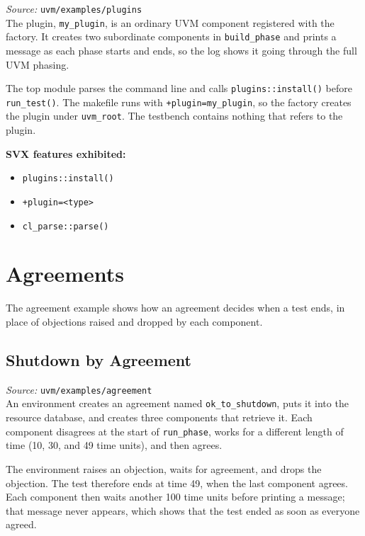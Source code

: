\documentclass[11pt,letterpaper]{report}
\begin{document}
\textit{Source:} \texttt{uvm/examples/plugins}\\

The plugin, \texttt{my\_plugin}, is an ordinary UVM component registered with the factory. It creates two subordinate components in \texttt{build\_phase} and prints a message as each phase starts and ends, so the log shows it going through the full UVM phasing.

The top module parses the command line and calls \texttt{plugins::install()} before \texttt{run\_test()}. The makefile runs with \texttt{+plugin=my\_plugin}, so the factory creates the plugin under \texttt{uvm\_root}. The testbench contains nothing that refers to the plugin.

\textbf{SVX features exhibited:}

\begin{itemize}
  \item \texttt{plugins::install()}
  \item \texttt{+plugin=\textless{}type\textgreater{}}
  \item \texttt{cl\_parse::parse()}
\end{itemize}
\chapter{Agreements}

The agreement example shows how an agreement decides when a test ends, in place of objections raised and dropped by each component.

\section{Shutdown by Agreement}

\textit{Source:} \texttt{uvm/examples/agreement}\\

An environment creates an agreement named \texttt{ok\_to\_shutdown}, puts it into the resource database, and creates three components that retrieve it. Each component disagrees at the start of \texttt{run\_phase}, works for a different length of time (10, 30, and 49 time units), and then agrees.

The environment raises an objection, waits for agreement, and drops the objection. The test therefore ends at time 49, when the last component agrees. Each component then waits another 100 time units before printing a message; that message never appears, which shows that the test ended as soon as everyone agreed.
\end{document}

